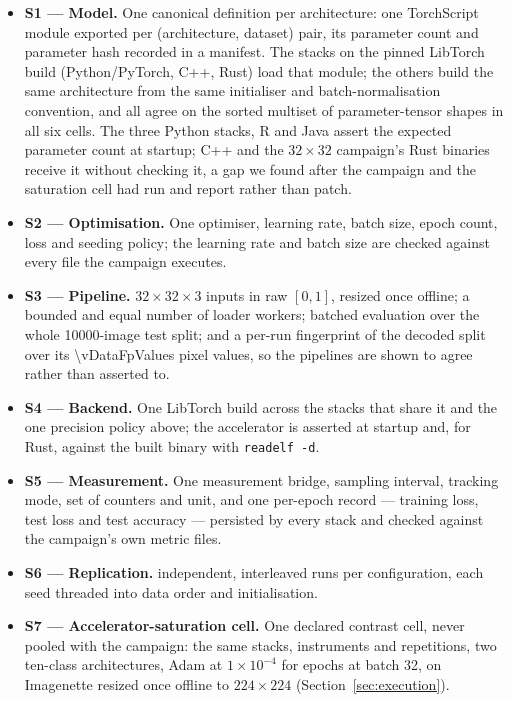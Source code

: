 \begin{itemize}\itemsep2pt
  \item \textbf{S1 --- Model.} One canonical definition per architecture: one
        TorchScript module exported per (architecture, dataset) pair, its
        parameter count and parameter hash recorded in a manifest. The
        \vCtrlStacks{} stacks on the pinned LibTorch build (Python/PyTorch, C++,
        Rust) load that module; the others build the same architecture from the
        same initialiser and batch-normalisation convention, and all
        \vEcosystems{} agree on the sorted multiset of parameter-tensor shapes in
        all six cells. The three Python stacks, R and Java assert the expected
        parameter count at startup; C++ and the $32\times32$ campaign's Rust
        binaries receive it without checking it, a gap we found after the campaign and the
        saturation cell had run and report rather than patch.
  \item \textbf{S2 --- Optimisation.} One optimiser, learning rate, batch size,
        epoch count, loss and seeding policy; the learning rate and batch size
        are checked against every file the campaign executes.
  \item \textbf{S3 --- Pipeline.} $32\times32\times3$ inputs in raw $[0,1]$,
        resized once offline; a bounded and equal number of loader workers;
        batched evaluation over the whole \num{10000}-image test split; and a
        per-run fingerprint of the decoded split over its \num{\vDataFpValues} pixel
        values, so the pipelines are shown to agree rather than asserted to.
  \item \textbf{S4 --- Backend.} One LibTorch build across the \vCtrlStacks{}
        stacks that share it and the one precision policy above; the
        accelerator is asserted at startup and, for Rust, against the built
        binary with \texttt{readelf -d}.
  \item \textbf{S5 --- Measurement.} One measurement bridge, sampling interval,
        tracking mode, set of counters and unit, and one per-epoch record ---
        training loss, test loss and test accuracy --- persisted by every stack
        and checked against the campaign's own metric files.
  \item \textbf{S6 --- Replication.} \vRepetitions{} independent, interleaved
        runs per configuration, each seed threaded into data order and
        initialisation.
  \item \textbf{S7 --- Accelerator-saturation cell.} One declared contrast cell,
        never pooled with the campaign: the same \vSatEcosystems{} stacks,
        instruments and \vSatReps{} repetitions, two ten-class architectures,
        Adam at $1\times10^{-4}$ for \vSatEpochs{} epochs at batch 32, on
        Imagenette resized once offline to $224\times224$
        (Section~\ref{sec:execution}).
\end{itemize}

